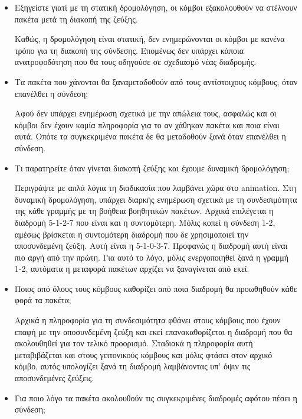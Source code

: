\documentclass[a4paper,9pt]{article}
\begin{document}
\begin{itemize}
    \item Εξηγείστε γιατί με τη στατική δρομολόγηση, οι κόμβοι εξακολουθούν να
        στέλνουν πακέτα μετά τη διακοπή της ζεύξης.

        Καθώς, η δρομολόγηση είναι στατική, δεν ενημερώνονται οι κόμβοι με κανένα
        τρόπο για τη διακοπή της σύνδεσης. Επομένως δεν υπάρχει κάποια ανατροφοδότηση
        που θα τους οδηγούσε σε σχεδιασμό νέας διαδρομής.

    \item Τα πακέτα που χάνονται θα ξαναμεταδοθούν από τους αντίστοιχους κόμβους,
        όταν επανέλθει η σύνδεση;

        Αφού δεν υπάρχει ενημέρωση σχετικά με την απώλεια τους, ασφαλώς και οι κόμβοι
        δεν έχουν καμία πληροφορία για το αν χάθηκαν πακέτα και ποια είναι αυτά. Οπότε
        τα συγκεκριμένα πακέτα δε θα μεταδοθούν ξανά όταν επανέλθει η σύνδεση.

    \item Τι παρατηρείτε όταν γίνεται διακοπή ζεύξης και έχουμε δυναμική
        δρομολόγηση; 

        Περιγράψτε με απλά λόγια τη διαδικασία που λαμβάνει χώρα στο animation.
        Στη δυναμική δρομολόγηση, υπάρχει διαρκής ενημέρωση σχετικά με τη
        συνδεσιμότητα της κάθε γραμμής με τη βοήθεια βοηθητικών πακέτων. Αρχικά
        επιλέγεται η διαδρομή 5-1-2-7 που είναι και η συντομότερη. Μόλις κοπεί η
        σύνδεση 1-2, αμέσως βρίσκεται η συντομότερη διαδρομή που δε χρησιμοποιεί την
        αποσυνδεμένη ζεύξη. Αυτή είναι η 5-1-0-3-7. Προφανώς η διαδρομή αυτή είναι πιο
        αργή από την πρώτη. Για αυτό το λόγο, μόλις ενεργοποιηθεί ξανά η γραμμή 1-2,
        αυτόματα η μεταφορά πακέτων αρχίζει να ξαναγίνεται από εκεί.

    \item Ποιος από όλους τους κόμβους καθορίζει από ποια διαδρομή θα προωθηθούν
        κάθε φορά τα πακέτα;

        Αρχικά η πληροφορία για τη συνδεσιμότητα φθάνει στους κόμβους που έχουν επαφή
        με την αποσυνδεμένη ζεύξη και εκεί επανακαθορίζεται η διαδρομή που θα
        ακολουθηθεί για τον τελικό προορισμό. Σταδιακά η πληροφορία αυτή μεταβιβάζεται
        και στους γειτονικούς κόμβους και μόλις φτάσει στον αρχικό κόμβο, αυτός
        υπολογίζει ξανά τη διαδρομή λαμβάνοντας υπ’ όψιν τις αποσυνδεμένες ζεύξεις.
    \item Για ποιο λόγο τα πακέτα ακολουθούν τις συγκεκριμένες διαδρομές αφότου
        πέσει η σύνδεση;


\end{itemize}
\end{document}

